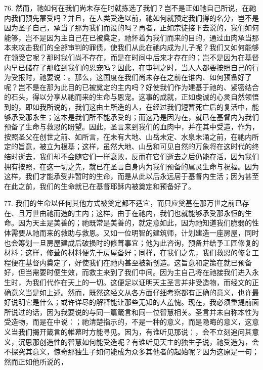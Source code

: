 76. 然而，祂如何在我们尚未存在时就拣选了我们？岂不是正如祂自己所说，在祂内我们预先蒙受吗？并且，在人类受造以前，祂如何就预定我们得的名分，岂不是因为圣子自己，承当了那为我们而设的吗？再者，正如宗徒接下去说的，我们如何能够，岂不是因为主自己在已被奠定，祂怀着为我们而来的目的，通过血肉承当那本来攻击我们的全部审判的罪债，使我们从此在祂内成为儿子呢？我们又如何能够在领受它呢？那时我们尚不存在，而是在时间中后来才存在的；岂不是因为在基督内早已储存了那临到我们的恩宠吗？因此，在审判之时，当人人都要按照自己的行为受报时，祂要说：。那么，这国度在我们尚未存在之前在谁内、如何预备好了呢？岂不是在那为此目的已被奠定的主内吗？好使我们作为建基于祂的、紧密结合的石头，得以分享从祂而来的生命与恩宠。这事的成就，正如虔诚的心灵自然领悟到的，即如我所说的，我们这由土所造的人，在经过我们短暂死亡后的复活中，能够承受那永生；这本是我们所不能承受的；而这乃是因为在，就已在基督内为我们预备了生命与救恩的盼望。因此，圣言来到我们的血肉中，并在其中受造，作为，按照圣父在创世之前、如所言，在未有大地、山岳未定、水泉未涌之前，在祂内所定的旨意，被立为根基；这样，虽然大地、山岳和可见自然的万象将在这时代的终结时逝去，我们却不会随它们一样衰败，反而在它们逝去之后仍能存活，因为我们拥有按照，在这一切之先，就已在圣言自身内为我们预备的属灵生命与祝福。因为这样，我们才能承受非暂时的生命，而是从此以后永远居于基督内生活；因为甚至在此之前，我们的生命就已在基督耶稣内被奠定和预备好了。\par

77. 我们的生命以任何其他方式被奠定都不适宜，而只应奠基在那万世之前已存在、且万世由祂而造的主内；这样，由于在祂内，我们也就能够承受那永恒的生命。因为天主是美善的；祂既常是美善的，就定意如此，因为祂知道我们脆弱的性体需要从祂而来的救助与救恩。又如一位明智的建筑师，计划建造一座房屋，同时也会筹划一旦房屋建成后破损时的修葺事宜；他为此咨询，预备并给予工匠修复的材料；这样，修葺的材料便先于房屋备好；同样，在我们之先，我们救恩的修复工程便在基督内奠定了，好使我们在祂内甚至被新创造。这旨意和定策在就已预备好，但当需要时便生效，而救主来到了我们中间。因为主自己将在祂接我们进入永生时，为我们代作在天上的一切。这便足以证明天主圣言并非受造物，而经文的正确意义当是如上述。然而，既然这经文从各方面仔细考察都有正确的意义，也许最好说明它是什么；或许详尽的解释能让那些无知的人羞愧。现在，我必须重提前面所说过的话，因为我要说的与同一篇箴言和同一位智慧相关。圣言并未自称本性为受造物，而是在中说：；祂清楚指示的，不是一种的意义，而是隐晦的意义，这意义当我们揭开箴言的帷幕时方能寻见。因为，有谁听见那说：，会不立刻追问其意义，沉思那创造性的智慧如何能受造呢？有谁听见天主的独生子说，祂受造为，会不探究其意义，惊奇那独生子如何能成为众多其他者的起始呢？因为这原是一句；然而正如他所说的，\par

